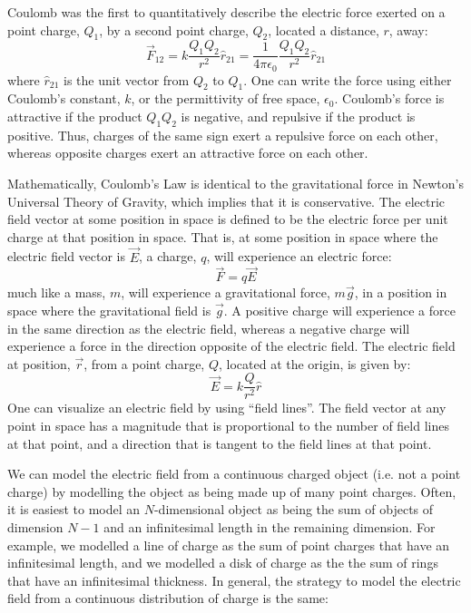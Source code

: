 Coulomb was the first to quantitatively describe the electric force exerted on a point charge, $Q_1$, by a second point charge, $Q_2$, located a distance, $r$, away:
\begin{equation}
\vec F_{12}=k\frac{Q_1Q_2}{r^2}\hat r_{21}=\frac{1}{4\pi\epsilon_0}\frac{Q_1Q_2}{r^2}\hat r_{21}
\end{equation}
where $\hat r_{21}$ is the unit vector from  $Q_2$ to $Q_1$. One can write the force using either Coulomb's constant, $k$, or the permittivity of free space, $\epsilon_0$. Coulomb's force is attractive if the product $Q_1Q_2$ is negative, and repulsive if the product is positive. Thus, charges of the same sign exert a repulsive force on each other, whereas opposite charges exert an attractive force on each other.

Mathematically, Coulomb's Law is identical to the gravitational force in Newton's Universal Theory of Gravity, which implies that it is conservative. The electric field vector at some position in space is defined to be the electric force per unit charge at that position in space. That is, at some position in space where the electric field vector is $\vec E$, a charge, $q$, will experience an electric force:
\begin{equation}
\vec F=q\vec E
\end{equation}
much like a mass, $m$, will experience a gravitational force, $m\vec g$, in a position in space where the gravitational field is $\vec g$. A positive charge will experience a force in the same direction as the electric field, whereas a negative charge will experience a force in the direction opposite of the electric field. The electric field at position, $\vec r$, from a point charge, $Q$, located at the origin, is given by:
\begin{equation}
\vec E = k\frac{Q}{r^2}\hat r
\end{equation}
One can visualize an electric field by using ``field lines''. The field vector at any point in space has a magnitude that is proportional to the number of field lines at that point, and a direction that is tangent to the field lines at that point.

We can model the electric field from a continuous charged object (i.e. not a point charge) by modelling the object as being made up of many point charges. Often, it is easiest to model an $N$-dimensional object as being the sum of objects of dimension $N -1$ and an infinitesimal length in the remaining dimension. For example, we modelled a line of charge as the sum of point charges that have an infinitesimal length, and we modelled a disk of charge as the the sum of rings that have an infinitesimal thickness. In general, the strategy to model the electric field from a continuous distribution of charge is the same:

